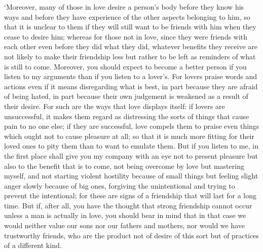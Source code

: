 ‘Moreover, many of those in love desire a person's body before they know
his ways and before they have experience of  the other aspects
belonging to him, so that it is unclear to them if they will still want
to be friends with him when they cease to desire him; whereas for those
not in love, since they were friends  with each other even
before they did what they did, whatever benefits they
receive are not likely to
make their friendship less but rather to be left as reminders of what is
still to come. Moreover, you should expect to become a better person if
you  listen to my arguments than if you listen to a lover's. For
lovers praise words and actions even if it means disregarding what is
best, in part because they are afraid of being hated, in part because
their own judgement is weakened as a result of their  desire.
For such are the ways that love displays itself: if lovers are
unsuccessful, it makes them regard as distressing the sorts of things
that cause pain to no one else; if they are successful, love compels
them to praise even things which ought not to  cause pleasure at
all; so that it is much more fitting for their loved ones to pity them
than to want to emulate them. But if you listen to me, in the first
place shall give you my company  with an eye not to present
pleasure but also to the benefit that is to come, not being overcome by
love but mastering myself, and not starting violent hostility because of
small things but feeling slight anger slowly because of big ones,
forgiving the  unintentional and trying to prevent the
intentional; for these are signs of a friendship that will last for a
long time. But if, after all, you have the thought that strong
friendship cannot  occur unless a man is actually in love, you
should bear in mind that in that case we would neither value our sons
nor our fathers and mothers, nor would we have trustworthy friends, who
are the product not of desire of this sort but of practices of a
different kind.

